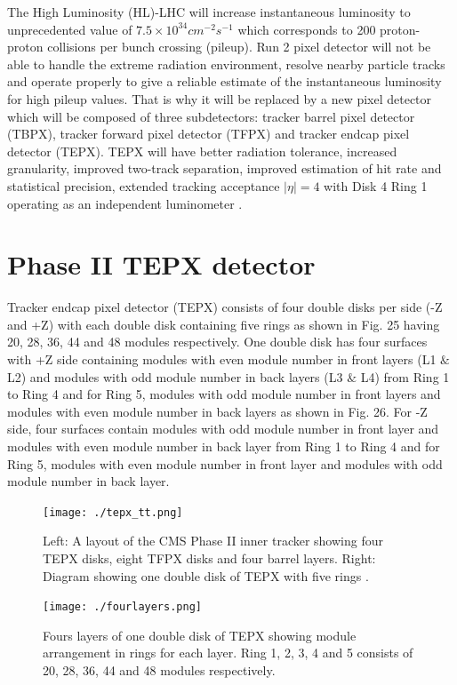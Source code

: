 The High Luminosity (HL)-LHC will increase instantaneous luminosity to unprecedented value of $7.5 \times 10^{34} cm^{-2} s^{-1}$ which corresponds to 200 proton-proton collisions per bunch crossing (pileup). Run 2 pixel detector will not be able to handle the extreme radiation environment, resolve nearby particle tracks and operate properly to give a reliable estimate of the instantaneous luminosity for high pileup values. That is why it will be replaced by a new pixel detector which will be composed of three subdetectors: tracker barrel pixel detector (TBPX), tracker forward pixel detector (TFPX) and tracker endcap pixel detector (TEPX). TEPX will have better radiation tolerance, increased granularity, improved two-track separation, improved estimation of hit rate and statistical precision, extended tracking acceptance $|\eta|=4$ with Disk 4 Ring 1 operating as an independent luminometer \cite{Klein:2017nke}. \\

\section{Phase II TEPX detector}

Tracker endcap pixel detector (TEPX) consists of four double disks per side (-Z and +Z) with each double disk containing five rings as shown in Fig. 25 having 20, 28, 36, 44 and 48 modules respectively. One double disk has four surfaces with +Z side containing modules with even module number in front layers (L1 $\&$ L2) and modules with odd module number in back layers (L3 $\&$ L4) from Ring 1 to Ring 4 and for Ring 5, modules with odd module number in front layers and modules with even module number in back layers as shown in Fig. 26. For -Z side, four surfaces contain modules with odd module number in front layer and modules with even module number in back layer from Ring 1 to Ring 4 and for Ring 5, modules with even module number in front layer and modules with odd module number in back layer. \\

\begin{figure}[H]
  \centering
  \texttt{[image: ./tepx\_tt.png]}
  \caption{ \onehalfspacing Left: A layout of the CMS Phase II inner tracker showing four TEPX disks, eight TFPX disks and four barrel layers. Right: Diagram showing one double disk of TEPX with five rings \cite{Klein:2017nke}.}
  \label{fig:CMS}
\end{figure}


\begin{figure}[H]
  \centering
  \texttt{[image: ./fourlayers.png]}
  \caption{ \onehalfspacing Fours layers of one double disk of TEPX showing module arrangement in rings for each layer. Ring 1, 2, 3, 4 and 5 consists of 20, 28, 36, 44 and 48 modules respectively. }
  \label{fig:CMS}
\end{figure}


